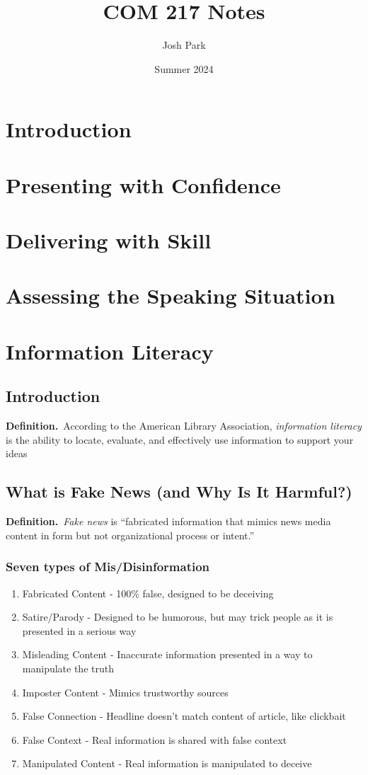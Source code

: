 \documentclass{report}
\title{COM 217 Notes}
\author{Josh Park}
\date{Summer 2024}
\newcommand{\dfn}[1]{\textbf{Definition.}\ #1}
\begin{document}
\maketitle
\chapter{Introduction} %

\chapter{Presenting with Confidence} %

\chapter{Delivering with Skill} %

\chapter{Assessing the Speaking Situation} %

\chapter{Information Literacy} %
    \section{Introduction}
        \dfn{According to the American Library Association, \emph{information literacy} is the ability to locate, evaluate, and effectively use information to support your ideas}
    
    \section{What is Fake News (and Why Is It Harmful?)}
    \dfn{\emph{Fake news} is ``fabricated information that mimics news media content in form but not organizational process or intent.''}
        \subsection{Seven types of Mis/Disinformation}
        \begin{enumerate}
            \item Fabricated Content - 100\% false, designed to be deceiving
            \item Satire/Parody - Designed to be humorous, but may trick people as it is presented in a serious way
            \item Misleading Content - Inaccurate information presented in a way to manipulate the truth
            \item Imposter Content - Mimics trustworthy sources
            \item False Connection - Headline doesn't match content of article, like clickbait
            \item False Context - Real information is shared with false context
            \item Manipulated Content - Real information is manipulated to deceive
        \end{enumerate}
\end{document}

